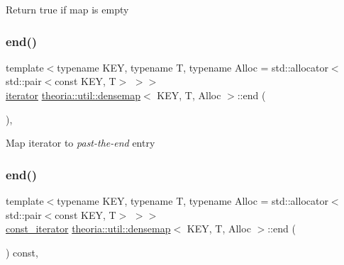 Return true if map is empty \mbox{\label{classtheoria_1_1util_1_1densemap_a2aebd517ccb28817684c62afc67396f3}} 
\subsubsection{\texorpdfstring{end()}{end()}\hspace{0.1cm}{\footnotesize\ttfamily [1/2]}}
{\footnotesize\ttfamily template$<$typename K\+EY, typename T, typename Alloc = std\+::allocator$<$std\+::pair$<$const K\+E\+Y, T$>$ $>$$>$ \\
\hyperlink{classtheoria_1_1util_1_1densemap_a4ee170442110252d3033534246f9677f}{iterator} \hyperlink{classtheoria_1_1util_1_1densemap}{theoria\+::util\+::densemap}$<$ K\+EY, T, Alloc $>$\+::end (\begin{DoxyParamCaption}{ }\end{DoxyParamCaption})\hspace{0.3cm}{\ttfamily [inline]}, {\ttfamily [noexcept]}}

Map iterator to {\itshape past-\/the-\/end} entry \mbox{\label{classtheoria_1_1util_1_1densemap_a2f1d82722dd454f5804a28d76acc0986}} 
\subsubsection{\texorpdfstring{end()}{end()}\hspace{0.1cm}{\footnotesize\ttfamily [2/2]}}
{\footnotesize\ttfamily template$<$typename K\+EY, typename T, typename Alloc = std\+::allocator$<$std\+::pair$<$const K\+E\+Y, T$>$ $>$$>$ \\
\hyperlink{classtheoria_1_1util_1_1densemap_a8c2937f8e4ba47abf344d9f9f23f0c88}{const\+\_\+iterator} \hyperlink{classtheoria_1_1util_1_1densemap}{theoria\+::util\+::densemap}$<$ K\+EY, T, Alloc $>$\+::end (\begin{DoxyParamCaption}{ }\end{DoxyParamCaption}) const\hspace{0.3cm}{\ttfamily [inline]}, {\ttfamily [noexcept]}}

